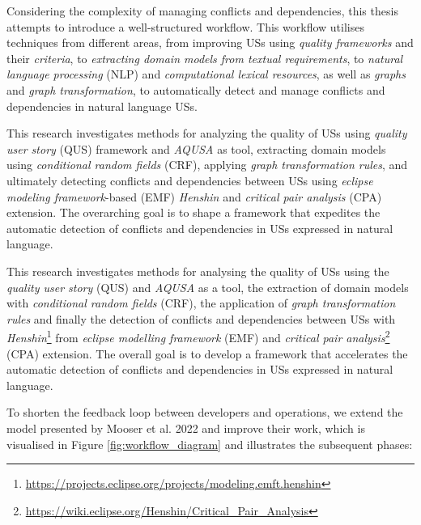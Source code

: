 Considering the complexity of managing conflicts and dependencies, this thesis attempts to introduce a well-structured workflow. This workflow utilises techniques from different areas, from improving USs using \emph{quality frameworks} and their \emph{criteria}, to \emph{extracting domain models from textual requirements}, to \emph{natural language processing} (NLP) and \emph{computational lexical resources}, as well as \emph{graphs} and \emph{graph transformation}, to automatically detect and manage conflicts and dependencies in natural language USs.

This research investigates methods for analyzing the quality of USs using \emph{quality user story} (QUS) framework and \emph{AQUSA} as tool, extracting domain models using  \emph{conditional random fields} (CRF), applying \emph{graph transformation rules}, and ultimately detecting conflicts and dependencies between USs using \emph{eclipse modeling framework}-based (EMF) \emph{Henshin} and \emph{critical pair analysis} (CPA) extension\cite{gomez2010systematic}. The overarching goal is to shape a framework that expedites the automatic detection of conflicts and dependencies in USs expressed in natural language.

This research investigates methods for analysing the quality of USs using the \emph{quality user story} (QUS) and \emph{AQUSA} as a tool, the extraction of domain models with \emph{conditional random fields} (CRF), the application of \emph{graph transformation rules} and finally the detection of conflicts and dependencies between USs with \emph{Henshin}\footnote{\href{https://projects.eclipse.org/projects/modeling.emft.henshin}{https://projects.eclipse.org/projects/modeling.emft.henshin}} from \emph{eclipse modelling framework} (EMF) and \emph{critical pair analysis}\footnote{\href{https://wiki.eclipse.org/Henshin/Critical\_Pair\_Analysis}{https://wiki.eclipse.org/Henshin/Critical\_Pair\_Analysis}} (CPA) extension\cite{gomez2010systematic}. The overall goal is to develop a framework that accelerates the automatic detection of conflicts and dependencies in USs expressed in natural language.

To shorten the feedback loop between developers and operations, we extend the model presented by Mooser et al. 2022 and improve their work, which is visualised in Figure \ref{fig:workflow_diagram} and illustrates the subsequent phases:

